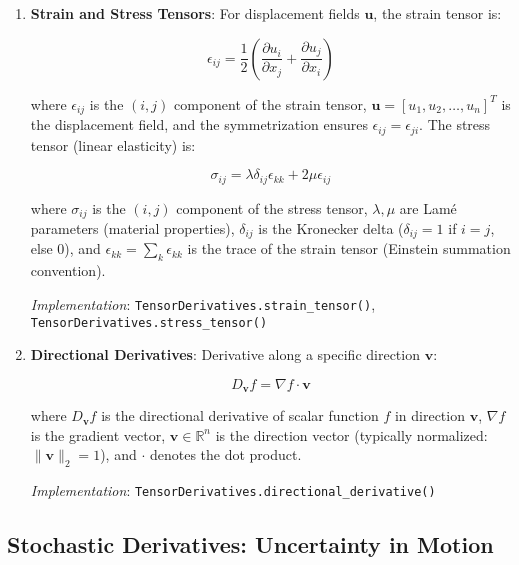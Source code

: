 \documentclass[10pt,journal,compsoc]{IEEEtran}
\begin{document}
\begin{enumerate}
    \item \textbf{Strain and Stress Tensors}: For displacement fields $\mathbf{u}$, the strain tensor is:
    
    \begin{equation}
        \epsilon_{ij} = \frac{1}{2}\left(\frac{\partial u_i}{\partial x_j} + \frac{\partial u_j}{\partial x_i}\right)
    \end{equation}
    
    where $\epsilon_{ij}$ is the $(i,j)$ component of the strain tensor, $\mathbf{u} = [u_1, u_2, \ldots, u_n]^T$ is the displacement field, and the symmetrization ensures $\epsilon_{ij} = \epsilon_{ji}$. The stress tensor (linear elasticity) is:
    
    \begin{equation}
        \sigma_{ij} = \lambda \delta_{ij} \epsilon_{kk} + 2\mu \epsilon_{ij}
    \end{equation}
    
    where $\sigma_{ij}$ is the $(i,j)$ component of the stress tensor, $\lambda, \mu$ are Lamé parameters (material properties), $\delta_{ij}$ is the Kronecker delta ($\delta_{ij} = 1$ if $i=j$, else $0$), and $\epsilon_{kk} = \sum_k \epsilon_{kk}$ is the trace of the strain tensor (Einstein summation convention).
    
    
    \textit{Implementation}: \texttt{TensorDerivatives.strain\_tensor()}, \texttt{TensorDerivatives.stress\_tensor()}
    
    \item \textbf{Directional Derivatives}: Derivative along a specific direction $\mathbf{v}$:
    
    \begin{equation}
        D_{\mathbf{v}}f = \nabla f \cdot \mathbf{v}
    \end{equation}
    
    where $D_{\mathbf{v}}f$ is the directional derivative of scalar function $f$ in direction $\mathbf{v}$, $\nabla f$ is the gradient vector, $\mathbf{v} \in \mathbb{R}^n$ is the direction vector (typically normalized: $\|\mathbf{v}\|_2 = 1$), and $\cdot$ denotes the dot product.
    
    
    \textit{Implementation}: \texttt{TensorDerivatives.directional\_derivative()}
\end{enumerate}

\subsection{Stochastic Derivatives: Uncertainty in Motion}
\end{document}
